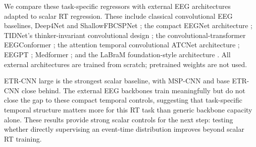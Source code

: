 \documentclass[12pt]{article}
\begin{document}
We compare these task-specific regressors with external EEG architectures adapted to scalar RT regression. These include classical convolutional EEG baselines, Deep4Net and ShallowFBCSPNet \citep{braindecode}; the compact EEGNet architecture \citep{lawhern2018eegnet}; TIDNet's thinker-invariant convolutional design \citep{kostas2020thinkerinvariance}; the convolutional-transformer EEGConformer \citep{song2023eegconformer}; the attention temporal convolutional ATCNet architecture \citep{altaheri2022atcnet}; EEGPT \citep{wang2024eegpt}; Medformer \citep{wang2024medformer}; and the LaBraM foundation-style architecture \citep{Jiang2024LaBraM}. All external architectures are trained from scratch; pretrained weights are not used.

ETR-CNN large is the strongest scalar baseline, with MSP-CNN and base ETR-CNN close behind. The external EEG backbones train meaningfully but do not close the gap to these compact temporal controls, suggesting that task-specific temporal structure matters more for this RT task than generic backbone capacity alone. These results provide strong scalar controls for the next step: testing whether directly supervising an event-time distribution improves beyond scalar RT training.
\end{document}
